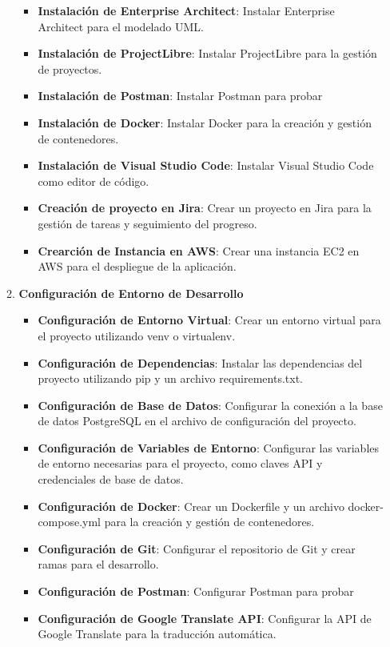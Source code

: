\begin{doublespace}
\begin{enumerate}[label=\alph*)]
\begin{enumerate}
\begin{itemize}
            \item \textbf{Instalación de Enterprise Architect}: Instalar Enterprise Architect para el modelado UML.
            \item \textbf{Instalación de ProjectLibre}: Instalar ProjectLibre para la gestión de proyectos.
            \item \textbf{Instalación de Postman}: Instalar Postman para probar
            \item \textbf{Instalación de Docker}: Instalar Docker para la creación y gestión de contenedores.
            \item \textbf{Instalación de Visual Studio Code}: Instalar Visual Studio Code como editor de código.
            \item \textbf{Creación de proyecto en Jira}: Crear un proyecto en Jira para la gestión de tareas y seguimiento del progreso.
            \item \textbf{Crearción de Instancia en AWS}: Crear una instancia EC2 en AWS para el despliegue de la aplicación.
        \end{itemize}
        \item \textbf{Configuración de Entorno de Desarrollo}\par
        \begin{itemize}
            \item \textbf{Configuración de Entorno Virtual}: Crear un entorno virtual para el proyecto utilizando venv o virtualenv.
            \item \textbf{Configuración de Dependencias}: Instalar las dependencias del proyecto utilizando pip y un archivo requirements.txt.
            \item \textbf{Configuración de Base de Datos}: Configurar la conexión a la base de datos PostgreSQL en el archivo de configuración del proyecto.
            \item \textbf{Configuración de Variables de Entorno}: Configurar las variables de entorno necesarias para el proyecto, como claves API y credenciales de base de datos.
            \item \textbf{Configuración de Docker}: Crear un Dockerfile y un archivo docker-compose.yml para la creación y gestión de contenedores.
            \item \textbf{Configuración de Git}: Configurar el repositorio de Git y crear ramas para el desarrollo.
            \item \textbf{Configuración de Postman}: Configurar Postman para probar
            \item \textbf{Configuración de Google Translate API}: Configurar la API de Google Translate para la traducción automática.

\end{itemize}
\end{enumerate}
\end{enumerate}
\end{doublespace}

